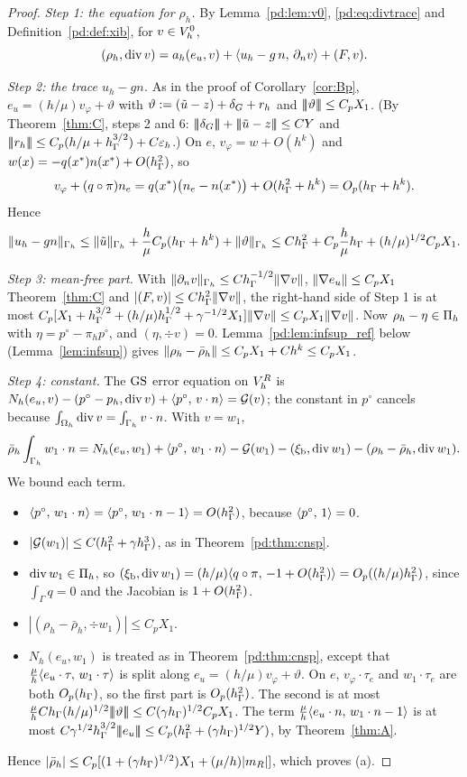 \begin{proof}
\emph{Step 1: the equation for $\rho_h$.} By Lemma~\ref{pd:lem:v0}, \eqref{pd:eq:divtrace} and Definition~\ref{pd:def:xib}, for $v\in V_h^0$,
\[
(\rho_h,\operatorname{div} v)=a_h(e_u,v)+\langle u_h-g\,n,\, \partial_n v\rangle+(F,v).
\]

\emph{Step 2: the trace $u_h-gn$.} As in the proof of Corollary~\ref{cor:Bp}, $e_u=(h/\mu)v_\varphi+\vartheta$ with $\vartheta:=(\tilde u-z)+\delta_G+r_h$ and $|\!|\!|\vartheta|\!|\!|\le C_pX_1$. (By Theorem~\ref{thm:C}, steps 2 and 6: $\tnorm{\delta_G}+\tnorm{\ut-z}\le CY$ and $|\!|\!|r_h|\!|\!|\le C_p(h/\mu+h_\Gamma^{3/2})+C\varepsilon_h$.) On $e$, $v_\varphi=w+O(h^k)$ and $w(x)=-q(x^\ast)n(x^\ast)+O(h_\Gamma^2)$, so
\[
v_\varphi+(q\circ\pi)n_e=q(x^\ast)\bigl(n_e-n(x^\ast)\bigr)+O(h_\Gamma^2+h^k)=O_p(h_\Gamma+h^k).
\]
Hence
\[
\lVert u_h-gn\rVert_{\Gamma_h}\le\lVert \tilde u\rVert_{\Gamma_h}+\frac h\mu C_p(h_\Gamma+h^k)+\lVert \vartheta\rVert_{\Gamma_h}\le Ch_\Gamma^2+C_p\frac h\mu h_\Gamma+(h/\mu)^{1/2}C_pX_1 .
\]

\emph{Step 3: mean-free part.} With $\lVert \partial_n v\rVert_{\Gamma_h}\le Ch_\Gamma^{-1/2}\lVert \nabla v\rVert$, $\lVert \nabla e_u\rVert\le C_pX_1$ Theorem~\ref{thm:C} and $|(F,v)|\le Ch_\Gamma^2\lVert \nabla v\rVert$, the right-hand side of Step 1 is at most $C_p[X_1+h_\Gamma^{3/2}+(h/\mu)h_\Gamma^{1/2}+\gamma^{-1/2}X_1]\lVert \nabla v\rVert\le C_pX_1\lVert \nabla v\rVert$. Now $\rho_h-\eta\in\Pi_h$ with $\eta=p^\circ-\pi_hp^\circ$, and $(\eta,\div v)=0$. Lemma~\ref{pd:lem:infsup_ref} below (Lemma~\ref{lem:infsup}) gives $\lVert \rho_h-\bar\rho_h\rVert\le C_pX_1+Ch^k\le C_pX_1$.

\emph{Step 4: constant.} The $\mathrm{GS}$ error equation on $V_h^R$ is $N_h(e_u,v)-(p^\circ-p_h,\operatorname{div} v)+\langle p^\circ,\, v\cdot n\rangle=\mathcal G(v)$; the constant in $p^\circ$ cancels because $\int_{\Omega_h}\operatorname{div} v=\int_{\Gamma_h}v\cdot n$. With $v=w_1$,
\[
\bar\rho_h\int_{\Gamma_h}w_1\cdot n=N_h(e_u,w_1)+\langle p^\circ,\, w_1\cdot n\rangle-\mathcal G(w_1)-(\xi_{\mathrm b},\operatorname{div} w_1)-(\rho_h-\bar\rho_h,\operatorname{div} w_1).
\]
We bound each term.
\begin{itemize}
\item $\langle p^\circ,\, w_1\cdot n\rangle=\langle p^\circ,\, w_1\cdot n-1\rangle=O(h_\Gamma^2)$, because $\langle p^\circ,\, 1\rangle=0$.
\item $|\mathcal G(w_1)|\le C(h_\Gamma^2+\gamma h_\Gamma^3)$, as in Theorem~\ref{pd:thm:cnsp}.
\item $\operatorname{div} w_1\in\Pi_h$, so $(\xi_{\mathrm b},\operatorname{div} w_1)=(h/\mu)\langle q\circ\pi,\, -1+O(h_\Gamma^2)\rangle=O_p((h/\mu)h_\Gamma^2)$, since $\int_\Gamma q=0$ and the Jacobian is $1+O(h_\Gamma^2)$.
\item $|(\rho_h-\bar\rho_h,\div w_1)|\le C_pX_1$.
\item $N_h(e_u,w_1)$ is treated as in Theorem~\ref{pd:thm:cnsp}, except that $\frac\mu h\langle e_u\cdot\tau,\, w_1\cdot\tau\rangle$ is split along $e_u=(h/\mu)v_\varphi+\vartheta$. On $e$, $v_\varphi\cdot\tau_e$ and $w_1\cdot\tau_e$ are both $O_p(h_\Gamma)$, so the first part is $O_p(h_\Gamma^2)$. The second is at most $\frac\mu hCh_\Gamma(h/\mu)^{1/2}|\!|\!|\vartheta|\!|\!|\le C(\gamma h_\Gamma)^{1/2}C_pX_1$. The term $\frac\mu h\langle e_u\cdot n,\, w_1\cdot n-1\rangle$ is at most $C\gamma^{1/2}h_\Gamma^{3/2}|\!|\!|e_u|\!|\!|\le C_p(h_\Gamma^2+(\gamma h_\Gamma)^{1/2}Y)$, by Theorem~\ref{thm:A}.
\end{itemize}
Hence $|\bar\rho_h|\le C_p[(1+(\gamma h_\Gamma)^{1/2})X_1+(\mu/h)|m_R|]$, which proves (a).


\end{proof}
